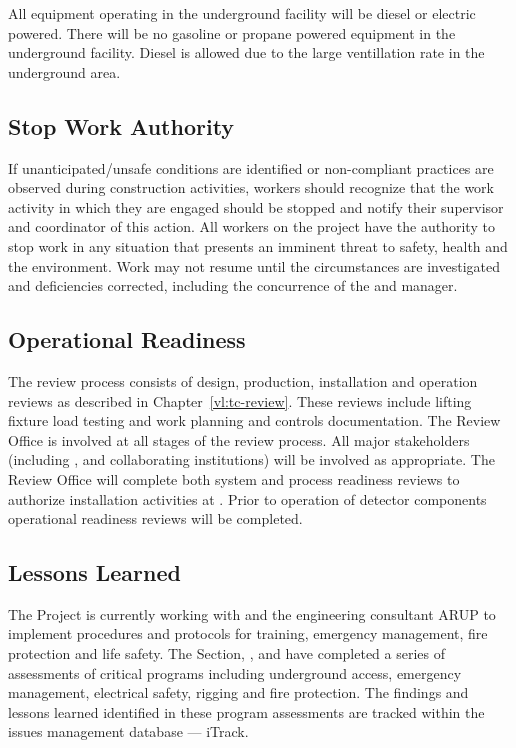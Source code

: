 All equipment operating in the underground facility will be diesel or
electric powered. There will be no gasoline or propane powered
equipment in the underground facility. Diesel is allowed due to the large
ventillation rate in the underground area.

\subsection{Stop Work Authority}

If unanticipated/unsafe conditions are identified or non-compliant
practices are observed during construction activities, workers should
recognize that the work activity in which they are engaged should be
stopped and notify their supervisor and   coordinator of
this action. All workers on the  project have the
authority to stop work in any situation that presents an imminent
threat to safety, health and the environment. Work may not resume
until the circumstances are investigated and deficiencies corrected,
including the concurrence of the  
and   manager.

\subsection{Operational Readiness}

The  review process consists of design, production,
installation and operation reviews as described in
Chapter~\ref{vl:tc-review}. These reviews include lifting fixture
load testing and work planning and controls documentation. The
 Review Office is involved at all stages of the review
process. All major stakeholders (including \fnal,  and
 collaborating institutions) will be involved as
appropriate. The Review Office will complete both system and process
readiness reviews to authorize installation activities at
.  Prior to operation of detector components operational
readiness reviews will be completed.

\subsection{Lessons Learned}

The  Project is currently working with  and the 
engineering consultant ARUP to implement  procedures and
protocols for training, emergency management, fire
protection and life safety. The \fnal {} Section, , and
  have completed a series of assessments of
critical   programs including underground access,
emergency management, electrical safety, rigging and fire
protection. The findings and lessons learned identified in these
 program assessments are tracked within the \fnal issues management
database --- iTrack.

